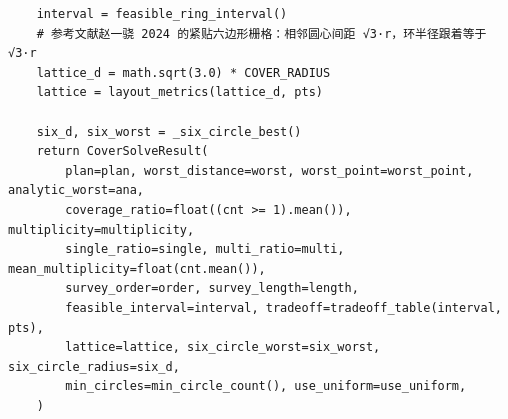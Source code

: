 \documentclass[UTF8, zihao=5,AutoFakeBold=2]{ctexart}
\begin{document}
\begin{lstlisting}
    interval = feasible_ring_interval()
    # 参考文献赵一骁 2024 的紧贴六边形栅格：相邻圆心间距 √3·r，环半径跟着等于 √3·r
    lattice_d = math.sqrt(3.0) * COVER_RADIUS
    lattice = layout_metrics(lattice_d, pts)

    six_d, six_worst = _six_circle_best()
    return CoverSolveResult(
        plan=plan, worst_distance=worst, worst_point=worst_point, analytic_worst=ana,
        coverage_ratio=float((cnt >= 1).mean()), multiplicity=multiplicity,
        single_ratio=single, multi_ratio=multi, mean_multiplicity=float(cnt.mean()),
        survey_order=order, survey_length=length,
        feasible_interval=interval, tradeoff=tradeoff_table(interval, pts),
        lattice=lattice, six_circle_worst=six_worst, six_circle_radius=six_d,
        min_circles=min_circle_count(), use_uniform=use_uniform,
    )
	\end{lstlisting}
\end{document}
